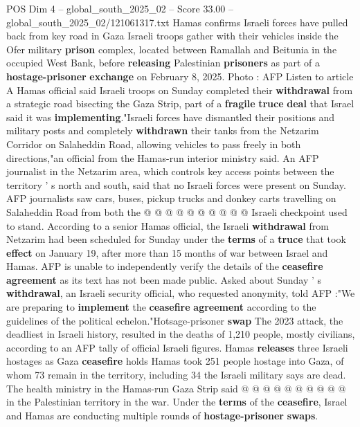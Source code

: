 \begin{textsample}{POS Dim 4 – global\_south\_2025\_02 – Score 33.00 – global\_south\_2025\_02/121061317.txt}  \label{ex:f4_pos_021}
Hamas confirms Israeli forces have pulled back from key road in Gaza Israeli troops gather with their vehicles inside the Ofer military \textbf{prison} complex, located between Ramallah and Beitunia in the occupied West Bank, before \textbf{releasing} Palestinian \textbf{prisoners} as part of a \textbf{hostage-prisoner} \textbf{exchange} on February 8, 2025.
Photo : AFP Listen to article A Hamas official said Israeli troops on Sunday completed their \textbf{withdrawal} from a strategic road bisecting the Gaza Strip, part of a \textbf{fragile} \textbf{truce} \textbf{deal} that Israel said it was \textbf{implementing}."Israeli forces have dismantled their positions and military posts and completely \textbf{withdrawn} their tanks from the Netzarim Corridor on Salaheddin Road, allowing vehicles to pass freely in both directions,"an official from the Hamas-run interior ministry said.
An AFP journalist in the Netzarim area, which controls key access points between the territory ' s north and south, said that no Israeli forces were present on Sunday.
AFP journalists saw cars, buses, pickup trucks and donkey carts travelling on Salaheddin Road from both the @ @ @ @ @ @ @ @ @ @ Israeli checkpoint used to stand.
According to a senior Hamas official, the Israeli \textbf{withdrawal} from Netzarim had been scheduled for Sunday under the \textbf{terms} of a \textbf{truce} that took \textbf{effect} on January 19, after more than 15 months of war between Israel and Hamas.
AFP is unable to independently verify the details of the \textbf{ceasefire} \textbf{agreement} as its text has not been made public.
Asked about Sunday ' s \textbf{withdrawal}, an Israeli security official, who requested anonymity, told AFP :"We are preparing to \textbf{implement} the \textbf{ceasefire} \textbf{agreement} according to the guidelines of the political echelon."Hotsage-prisoner \textbf{swap} The 2023 attack, the deadliest in Israeli history, resulted in the deaths of 1,210 people, mostly civilians, according to an AFP tally of official Israeli figures.
Hamas \textbf{releases} three Israeli hostages as Gaza \textbf{ceasefire} holds Hamas took 251 people hostage into Gaza, of whom 73 remain in the territory, including 34 the Israeli military says are dead.
The health ministry in the Hamas-run Gaza Strip said @ @ @ @ @ @ @ @ @ @ in the Palestinian territory in the war.
Under the \textbf{terms} of the \textbf{ceasefire}, Israel and Hamas are conducting multiple rounds of \textbf{hostage-prisoner} \textbf{swaps}.

\end{textsample}
